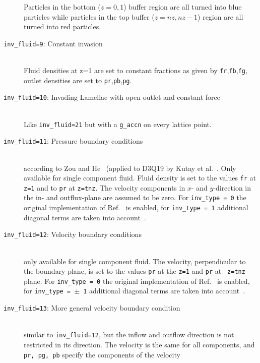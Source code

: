 \documentclass[a4paper]{article}
\begin{document}
\begin{description}
		Particles in the bottom ($z=0,1$) buffer region are all turned into
		blue particles while particles in the top buffer ($z=nz,nz-1$) region
                are all turned into red particles.
              \item[{\tt inv\_fluid=9}: Constant invasion]\ \\
		Fluid densities at z=1 are set to constant fractions as given
                by {\tt fr},{\tt fb},{\tt fg}, outlet densities are set to
                {\tt pr},{\tt pb},{\tt pg}.
              \item[{\tt inv\_fluid=10}: Invading Lamellae with open outlet and constant force]\ \\
		Like {\tt inv\_fluid=21} but with a {\tt g\_accn} on every
                lattice point.
              \item[{\tt inv\_fluid=11}: Pressure boundary conditions]\ \\
                according to Zou and He~\cite{bib:zouhe} (applied to D3Q19 by
                Kutay et al.~\cite{bib:kutay}. Only available for single
                component fluid. Fluid density is set to the values {\tt fr}
                at {\tt z=1} and to {\tt pr} at {\tt z=tnz}. The velocity
                components in $x$- and $y$-direction in the in- and
                outflux-plane are assumed to be zero.  For {\tt inv\_type = 0}
                the original implementation of Ref.~\cite{bib:kutay} is
                enabled, for {\tt inv\_type = 1} additional diagonal terms are
                taken into account~\cite{bib:hecht08}.
              \item[{\tt inv\_fluid=12}: Velocity boundary conditions]\ \\
                only available for single component fluid. The velocity,
                perpendicular to the boundary plane, is set
                to the values {\tt pr} at the {\tt z=1} and {\tt pr} at {\tt
                  z=tnz}-plane. For {\tt inv\_type = 0} the original implementation of
                Ref.~\cite{bib:kutay} is enabled, for {\tt inv\_type = $\pm$ 1}
                additional diagonal terms
                are taken into account~\cite{bib:hecht08}. 
	\item[{\tt inv\_fluid=13}: More general velocity boundary condition]\ \\
           similar to {\tt inv\_fluid=12}, but the inflow and outflow direction
           is not restricted in its direction\cite{bib:hecht08}. The velocity is the 
           same for all
           components, and {\tt pr, pg, pb} specify the components of the velocity

\end{description}
\end{document}
